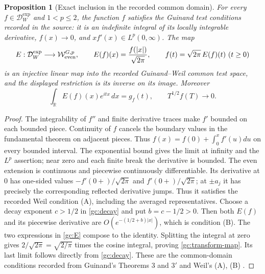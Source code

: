 \documentclass[11pt]{article}
\newtheorem{proposition}[theorem]{Proposition}
\newcommand{\R}{\mathbb R}
\begin{document}
\begin{proposition}[Exact inclusion in the recorded common domain]
For every $f\in\mathcal D_W^{\exp}$ and $1<p\le2$, the function $f$
satisfies the Guinand test conditions recorded in the source:
it is an indefinite integral of its locally integrable derivative,
$f(x)\to0$, and $xf'(x)\in L^p(0,\infty)$.
The map
\begin{equation}
 E:\mathcal D_W^{\exp}\longrightarrow
       \mathcal W_{\rm even}^{G,p},\qquad
 E(f)(x)=\frac{f(|x|)}{\sqrt{2\pi}},
 \qquad f(t)=\sqrt{2\pi}\,E(f)(t)\ (t\ge0)
 \label{gc:E}
\end{equation}
is an injective linear map into the recorded Guinand--Weil common test
space, and the displayed restriction is its inverse on its image.
Moreover
\begin{equation}
 \int_\R E(f)(x)e^{itx}\,dx=g_f(t),\qquad
 T^{1/2}f(T)\longrightarrow0.
 \label{gc:transform-map}
\end{equation}
\end{proposition}
\begin{proof}
The integrability of $f''$ and finite derivative traces make $f'$ bounded
on each bounded piece.  Continuity of $f$ cancels the boundary values in
the fundamental theorem on adjacent pieces.  Thus
$f(x)=f(0)+\int_0^x f'(u)du$ on every bounded interval.
The exponential bound gives the limit at infinity and the $L^p$ assertion;
near zero and each finite break the derivative is bounded.
The even extension is continuous and piecewise continuously
differentiable.  Its derivative at $0$ has one-sided values
$-f'(0+)/\sqrt{2\pi}$ and $f'(0+)/\sqrt{2\pi}$; at $\pm a_j$ it
has precisely the corresponding reflected derivative jumps.  Thus it
satisfies the recorded Weil condition (A), including the averaged
representatives.  Choose a decay exponent $c>1/2$ in \eqref{gc:decay} and
put $b=c-1/2>0$.  Then both $E(f)$ and its piecewise derivative are
$O(e^{-(1/2+b)|x|})$, which is condition (B).
The two expressions in \eqref{gc:E} compose to the identity.  Splitting
the integral at zero gives
$2/\sqrt{2\pi}=\sqrt{2/\pi}$ times the cosine integral, proving
\eqref{gc:transform-map}.  Its last limit follows directly from
\eqref{gc:decay}.  These are the common-domain conditions recorded from
Guinand's Theorems 3 and $3'$ and Weil's (A), (B)
\cite[pp.~112--115]{guinand1948}\cite[Collected Papers II, pp.~52--58]{weil1952}.
\end{proof}
\end{document}
